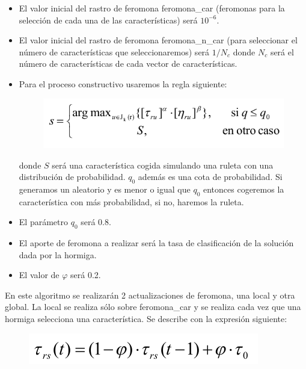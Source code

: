 \begin{itemize}
	\item El valor inicial del rastro de feromona feromona\_car (feromonas para la selección de cada una de las características) será $10^{-6}$.
	
	\item El valor inicial del rastro de feromona feromona\_n\_car (para seleccionar el número de características que seleccionaremos) será $1/N_c$ donde $N_c$ será el número de características de cada vector de características.
	
	\item Para el proceso constructivo usaremos la regla siguiente:
	
	\begin{figure} [H]
	\centering
	\includegraphics[width=0.7\linewidth]{constructivo}
	\label{fig:constructivo}
	\end{figure}
	
	donde $S$ será una característica cogida simulando una ruleta con una distribución de probabilidad. $q_0$ además es una cota de probabilidad. Si generamos un aleatorio y es menor o igual que $q_0$ entonces cogeremos la característica con más probabilidad, si no, haremos la ruleta.

	\item El parámetro $q_0$ será 0.8.
	
	\item El aporte de feromona a realizar será la tasa de clasificación de la solución dada por la hormiga.
	
	\item El valor de $\varphi $ será 0.2.
	

\end{itemize}

En este algoritmo se realizarán 2 actualizaciones de feromona, una local y otra global. La local se realiza sólo sobre feromona\_car y se realiza cada vez que una hormiga selecciona una característica. Se describe con la expresión siguiente:
\begin{figure} [H]
\centering
\includegraphics[width=0.5\linewidth]{actualizacionlocal}
\label{fig:actualizacionlocal}
\end{figure}

